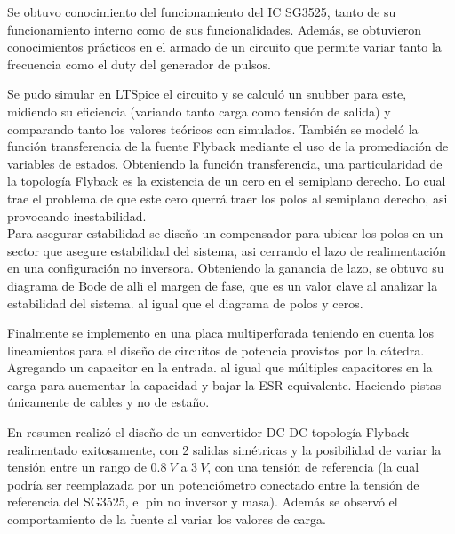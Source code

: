 
Se obtuvo conocimiento del funcionamiento del IC SG3525, tanto de su funcionamiento interno como de sus funcionalidades. Además, se obtuvieron conocimientos prácticos en el armado de un circuito que permite variar tanto la frecuencia como el duty del generador de pulsos. 

Se pudo simular en LTSpice el circuito y se calculó un snubber para este, midiendo su eficiencia (variando tanto carga como tensión de salida) y comparando tanto los valores teóricos con simulados. También se modeló la función transferencia de la fuente Flyback mediante el uso de la promediación de variables de estados. Obteniendo la función transferencia, una particularidad de la topología Flyback es la existencia de un cero en el semiplano derecho. Lo cual trae el problema de que este cero querrá traer los polos al semiplano derecho, asi provocando inestabilidad.\\
Para asegurar estabilidad se diseño un compensador  para ubicar los polos en un sector que asegure estabilidad del sistema, asi cerrando el lazo de realimentación en una configuración no inversora. Obteniendo la ganancia de lazo, se obtuvo su diagrama de Bode de alli el margen de fase, que es un valor clave al analizar la estabilidad del sistema. al igual que el diagrama de polos y ceros.

Finalmente se implemento en una placa multiperforada teniendo en cuenta los lineamientos para el diseño de circuitos de potencia provistos por la cátedra. Agregando un capacitor en la entrada. al igual que múltiples capacitores en la carga para auementar la capacidad y bajar la ESR equivalente.
Haciendo pistas únicamente de cables y no de estaño.
 
En resumen realizó el diseño de un convertidor DC-DC topología Flyback realimentado exitosamente, con 2 salidas simétricas y la posibilidad de variar la tensión entre un rango de $0.8 \ V$ a $3 \ V$, con una tensión de referencia (la cual podría ser reemplazada por un potenciómetro conectado entre la tensión de referencia del SG3525, el pin no inversor y masa). Además se observó el comportamiento de la fuente al variar los valores de carga.
